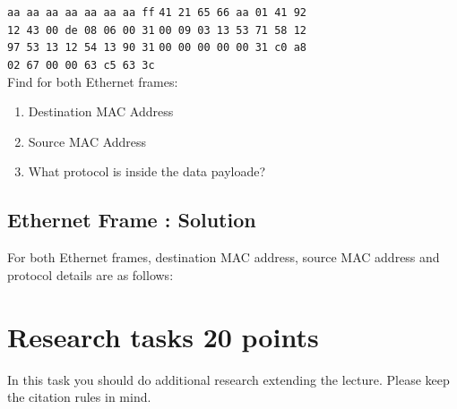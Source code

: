 \documentclass{resources/WeSTassignment}
\begin{document}
    \texttt{aa aa aa aa aa aa aa ff} \hspace{2cm} \texttt{41 21 65 66 aa 01 41 92} \\
    \texttt{12 43 00 de 08 06 00 31} \hspace{2cm} \texttt{00 09 03 13 53 71 58 12} \\
    \texttt{97 53 13 12 54 13 90 31} \hspace{2cm} \texttt{00 00 00 00 00 31 c0 a8} \\ 
    \texttt{02 67 00 00 63 c5 63 3c} \\
    
    Find for both Ethernet frames:
    \begin{enumerate}
        \item Destination MAC Address
        \item Source MAC Address
        \item What protocol is inside the data payloade?
    \end{enumerate}
    
\subsection{Ethernet Frame : Solution}
For both Ethernet frames, destination MAC address, source MAC address and protocol details are as follows:
\begin{table}[h]
\centering
\caption{Destination MAC address, Source MAC address and Protocol}
\label{tab:Destination MAC address, Source MAC address and Protocol}
\end{table}
    
    

\section{Research tasks \hfill {20 points}}
In this task you should do additional research extending the lecture. Please keep the citation rules in mind.
\end{document}
